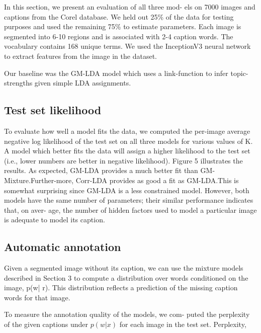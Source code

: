 In this section, we present an evaluation of all three mod-
els on 7000 images and captions from the Corel database. We held out 25\% of the data for testing purposes and used the remaining 75\% to estimate parameters. Each image is segmented into 6-10 regions and is associated with 2-4 caption words. The vocabulary contains 168 unique terms. We used the InceptionV3 neural network to extract features from the image in the dataset.

Our baseline was the GM-LDA model\cite{Blei2003} which uses a link-function to infer topic-strengths given simple LDA assignments.

\subsection{Test set likelihood }
To evaluate how well a model fits the data, we computed
the per-image average negative log likelihood of the test set on all three models for various values of K. A model which better fits the data will assign a higher likelihood to the test set (i.e., lower numbers are better in negative likelihood). Figure 5 illustrates the results. As expected, GM-LDA provides a much better fit than GM-Mixture.Further-more, Corr-LDA provides as good a fit as GM-LDA.This is somewhat surprising since GM-LDA is a less constrained model. However, both models have the same number of parameters; their similar performance indicates that, on aver- age, the number of hidden factors used to model a particular image is adequate to model its caption.

\subsection{Automatic annotation}
Given a segmented image without its caption, we can use
the mixture models described in Section 3 to compute a
distribution over words conditioned on the image, p(w| r). This distribution reflects a prediction of the missing caption words for that image.

To measure the annotation quality of the models, we com-
puted the perplexity of the given captions under $p(w| x)$ for each image in the test set. Perplexity,


